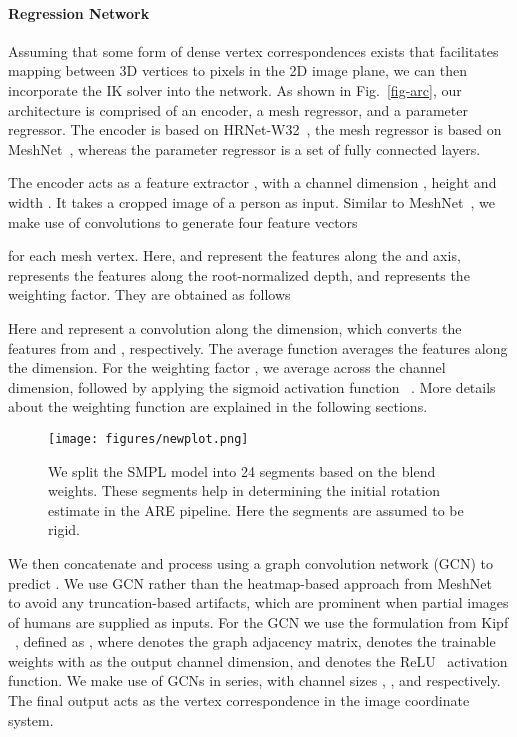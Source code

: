 \documentclass[10pt,twocolumn,letterpaper]{article}
\begin{document}
\paragraph{Regression Network}
Assuming that some form of dense vertex correspondences exists that facilitates mapping between 3D vertices to pixels in the 2D image plane, we can then incorporate the IK solver into the network. As shown in Fig.~\ref{fig-arc}, our architecture is comprised of an encoder, a mesh regressor, and a parameter regressor. The encoder is based on HRNet-W32~\cite{hrnet}, the mesh regressor is based on MeshNet~\cite{i2l}, whereas the parameter regressor is a set of fully connected layers.  

The encoder acts as a feature extractor , with a channel dimension , height and width . It takes a cropped image  of a person as input. Similar to MeshNet~\cite{i2l}, we make use of  convolutions to generate four feature vectors

for each mesh vertex. Here,  and  represent the features along the  and  axis,  represents the features along the root-normalized depth, and  represents the weighting factor. They are obtained as follows 

Here  and  represent a  convolution along the  dimension, which converts the features  from  and  , respectively. The average function  averages the features along the  dimension. For the weighting factor , we average across the channel dimension, followed by applying the sigmoid activation function ~\cite{sigmoid}. More details about the weighting function  are explained in the following sections. 

\begin{figure}[!b]
\begin{center}
\texttt{[image: figures/newplot.png]}
\end{center}
  \caption{We split the SMPL model into 24 segments based on the blend weights. These segments help in determining the initial rotation estimate in the ARE pipeline.
   Here the segments are assumed to be rigid.}
\label{fig-2}
\end{figure}



We then concatenate and process  using a graph convolution network (GCN) to predict . We use GCN rather than the heatmap-based approach from MeshNet~\cite{i2l} to avoid any truncation-based artifacts, which are prominent when partial images of humans are supplied as inputs. For the GCN we use the formulation from Kipf \etal ~\cite{gcn}, defined as , where   denotes the graph adjacency matrix,  denotes the trainable weights with  as the output channel dimension, and  denotes the ReLU~\cite{relu} activation function. We make use of  GCNs in series, with channel sizes , , and  respectively. The final output  acts as the vertex correspondence in the image coordinate system.
\end{document}
